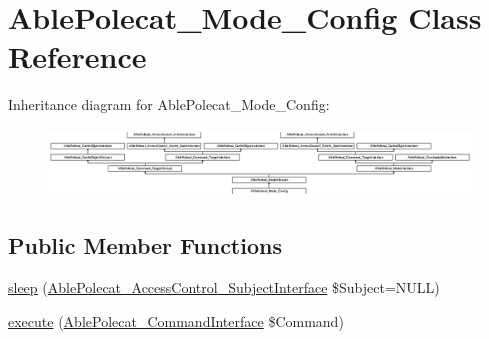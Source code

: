 \hypertarget{class_able_polecat___mode___config}{}\section{Able\+Polecat\+\_\+\+Mode\+\_\+\+Config Class Reference}
\label{class_able_polecat___mode___config}
Inheritance diagram for Able\+Polecat\+\_\+\+Mode\+\_\+\+Config\+:\begin{figure}[H]
\begin{center}
\leavevmode
\includegraphics[height=1.806452cm]{class_able_polecat___mode___config}
\end{center}
\end{figure}
\subsection*{Public Member Functions}
\begin{DoxyCompactItemize}
\item 
\hyperlink{class_able_polecat___mode___config_a365e24d7b066205cafa2a5cce3a4f224}{sleep} (\hyperlink{interface_able_polecat___access_control___subject_interface}{Able\+Polecat\+\_\+\+Access\+Control\+\_\+\+Subject\+Interface} \$Subject=N\+U\+L\+L)
\item 
\hyperlink{class_able_polecat___mode___config_aa7f01cbd17bffdbbb7511a3c37756064}{execute} (\hyperlink{interface_able_polecat___command_interface}{Able\+Polecat\+\_\+\+Command\+Interface} \$Command)
\end{DoxyCompactItemize}
